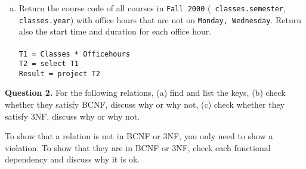 \documentclass[11pt]{article}
\begin{document}
\begin{enumerate}  [(a)]
\item Return the course code of all courses in {\tt Fall 2000} ({\tt
  classes.semester}, {\tt classes.year}) with office hours that are
  not on {\tt Monday, Wednesday}. Return also the start time and duration
  for each office hour. \\\\
\texttt{T1 = Classes * Officehours} \\
\texttt{T2 = select T1} \\
\texttt{Result = project T2} \\
\end{enumerate}

{\bf Question 2.} For the following relations, (a) find and list the
keys, (b) check whether they satisfy BCNF, discuss why or why not, (c)
check whether they satisfy 3NF, discuss why or why not.

To show that a relation is not in BCNF or 3NF, you only need to show a
violation. To show that they are in BCNF or 3NF, check each functional
dependency and discuss why it is ok.
\end{document}
